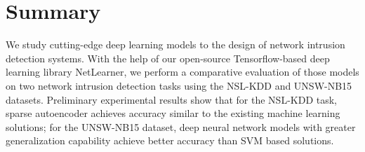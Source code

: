 \section{Summary}
We study cutting-edge deep learning models to the design of network intrusion detection systems.
With the help of our open-source Tensorflow-based deep learning library NetLearner,
we perform a comparative evaluation of those models on two network intrusion detection tasks using the NSL-KDD and UNSW-NB15 datasets.
Preliminary experimental results show that for the NSL-KDD task, sparse autoencoder achieves accuracy similar to the existing machine learning solutions;
for the UNSW-NB15 dataset, deep neural network models with greater generalization capability achieve better accuracy than SVM based solutions.
